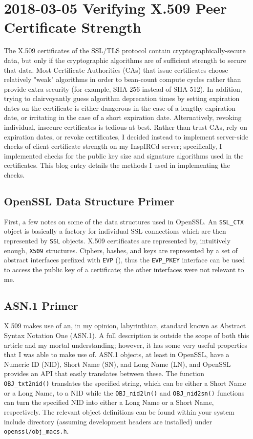 \documentclass{article}
\begin{document}
\section{2018-03-05 Verifying X.509 Peer Certificate Strength}
The\label{2018-03-05-peer-cert-strength} X.509 certificates of the SSL/TLS protocol contain cryptographically-secure data, but only if the cryptographic algorithms are of sufficient strength to secure that data.  Most Certificate Authorities (CAs) that issue certificates choose relatively "weak" algorithms in order to bean-count compute cycles rather than provide extra security (for example, SHA-256 instead of SHA-512).  In addition, trying to clairvoyantly guess algorithm deprecation times by setting expiration dates on the certificate is either dangerous in the case of a lengthy expiration date, or irritating in the case of a short expiration date.  Alternatively, revoking individual, insecure certificates is tedious at best.  Rather than trust CAs, rely on expiration dates, or revoke certificates, I decided instead to implement server-side checks of client certificate strength on my InspIRCd server; specifically, I implemented checks for the public key size and signature algorithms used in the certificates.  This blog entry details the  methods I used in implementing the checks.

\subsection{OpenSSL Data Structure Primer}
First, a few notes on some of the data structures used in OpenSSL.  An \texttt{SSL_CTX} object is basically a factory for individual SSL connections which are then represented by \texttt{SSL} objects.  X.509 certificates are represented by, intuitively enough, \texttt{X509} structures.  Ciphers, hashes, and keys are represented by a set of abstract interfaces prefixed with \texttt{EVP} (), thus the \texttt{EVP_PKEY} interface can be used to access the public key of a certificate; the other interfaces were not relevant to me.

\subsection{ASN.1 Primer}
X.509 makes use of an, in my opinion, labyrinthian, standard known as Abstract Syntax Notation One (ASN.1).  A full description is outside the scope of both this article and my mortal understanding; however, it has some very useful properties that I was able to make use of.  ASN.1 objects, at least in OpenSSL, have a Numeric ID (NID), Short Name (SN), and Long Name (LN), and OpenSSL provides an API that easily translates between these.  The function \texttt{OBJ_txt2nid()} translates the specified string, which can be either a Short Name or a Long Name, to a NID while the \texttt{OBJ_nid2ln()} and \texttt{OBJ_nid2sn()} functions can turn the specified NID into either a Long Name or a Short Name, respectively.  The relevant object definitions can be found within your system include directory (assuming development headers are installed) under \texttt{openssl/obj_macs.h}.
\end{document}
